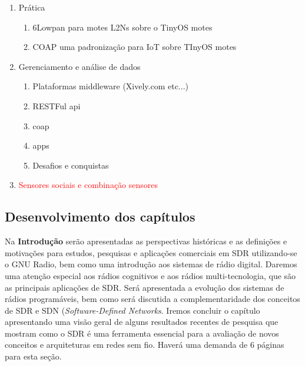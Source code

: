 \documentclass{SBCbookchapter}
\begin{document}
\begin{enumerate}
\begin{enumerate}
\begin{itemize}
    				\end{itemize}
    		\end{enumerate}
  	\item Prática
    		\begin{enumerate}
    			\item 6Lowpan para motes L2Ns sobre o TinyOS motes
    			\item COAP uma padronização para IoT sobre TInyOS motes
    		\end{enumerate}
    	\item Gerenciamento e análise de dados
    		\begin{enumerate}
    			\item Plataformas middleware (Xively.com etc...)
    			\item RESTFul api
    			\item coap
    			\item apps
    			\item Desafios e conquistas
    		\end{enumerate}
    
    	\item \textcolor{red}{Sensores sociais e combinação sensores}
	\end{enumerate}


    


\subsection{Desenvolvimento dos capítulos}

Na \textbf{Introdução} serão apresentadas as perspectivas históricas e as definições e motivações para estudos, pesquisas e aplicações comerciais em SDR utilizando-se o GNU Radio, bem como uma introdução aos sistemas de rádio digital. Daremos uma atenção especial aos rádios cognitivos e aos rádios multi-tecnologia, que são as principais aplicações de SDR. Será apresentada a evolução dos sistemas de rádios programáveis, bem como será discutida a complementaridade dos conceitos de SDR e SDN ({\it Software-Defined Networks}. Iremos concluir o capítulo apresentando uma visão geral de alguns resultados recentes de pesquisa que mostram como o SDR é uma ferramenta essencial para a avaliação de novos conceitos e arquiteturas em redes sem fio. Haverá uma demanda de 6 páginas para esta seção.
\end{document}
